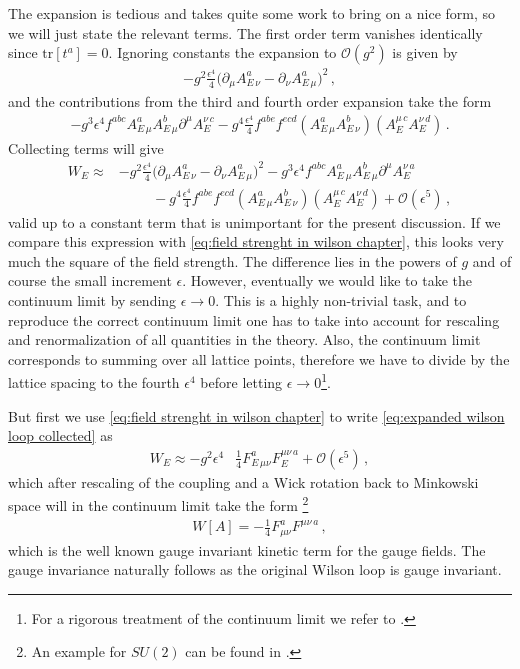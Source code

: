 The expansion is tedious and takes quite some work to bring on a nice form, so we will just state the relevant terms. The first order term vanishes identically since $\text{tr}[t^{a}]=0$. Ignoring constants the expansion to $\mathcal{O}(g^{2})$ is given by
\begin{align}
    -g^{2}\frac{\epsilon^{4}}{4}\big(\partial_{\mu}A_{E\,\nu}^{a}-\partial_{\nu}A_{E\,\mu}^{a}\big)^{2}\,,
\end{align}
and the contributions from the third and fourth order expansion take the form
\begin{align}
    -g^{3}\epsilon^{4}f^{abc}A_{E\,\mu}^{a}A_{E\,\mu}^{b}\partial^{\mu}A_{E}^{\nu\,c}-g^{4}\frac{\epsilon^{4}}{4}f^{abe}f^{ecd}(A_{E\,\mu}^{a}A_{E\,\nu}^{b})(A_{E}^{\mu\,c}A_{E}^{\nu\,d})\,.
\end{align}
Collecting terms will give
\begin{align}\label{eq:expanded wilson loop collected}
    W_{E}\approx&-g^{2}\frac{\epsilon^{4}}{4}\big(\partial_{\mu}A_{E\,\nu}^{a}-\partial_{\nu}A_{E\,\mu}^{a}\big)^{2}-g^{3}\epsilon^{4}f^{abc}A_{E\,\mu}^{a}A_{E\,\mu}^{b}\partial^{\mu}A_{E}^{\nu\,a}\nonumber
    \\
    &\hspace{1cm}-g^{4}\frac{\epsilon^{4}}{4}f^{abe}f^{ecd}(A_{E\,\mu}^{a}A_{E\,\nu}^{b})(A_{E}^{\mu\,c}A_{E}^{\nu\,d})+\mathcal{O}(\epsilon^{5})\,,
\end{align}
valid up to a constant term that is unimportant for the present discussion. If we compare this expression with \cref{eq:field strenght in wilson chapter}, this looks very much the square of the field strength. The difference lies in the powers of $g$ and of course the small increment $\epsilon$. However, eventually we would like to take the continuum limit by sending $\epsilon\rightarrow 0$. This is a highly non-trivial task, and to reproduce the correct continuum limit one has to take into account for rescaling and renormalization of all quantities in the theory. Also, the continuum limit corresponds to summing over all lattice points, therefore we have to divide by the lattice spacing to the fourth $\epsilon^{4}$ before letting $\epsilon\rightarrow 0$\footnote{For a rigorous treatment of the continuum limit we refer to \cite{CASELLE_2000}.}.

But first we use \cref{eq:field strenght in wilson chapter} to write \cref{eq:expanded wilson loop collected} as   
\begin{align}
    W_{E}\approx-g^{2}\epsilon^{4}&\frac{1}{4}F_{E\,\mu\nu}^{a}F_{E}^{\mu\nu\,a}+\mathcal{O}(\epsilon^{5})\,,
\end{align}
which after rescaling of the coupling and a Wick rotation back to Minkowski space will in the continuum limit take the form \footnote{An example for $SU(2)$ can be found in \cite{Peskin:257493}.}
\begin{align}\label{eq:gauge field kinetic term}
    W[A]=-\frac{1}{4}F_{\mu\nu}^{a}F^{\mu\nu\,a}\,,
\end{align}
which is the well known gauge invariant kinetic term for the gauge fields. The gauge invariance naturally follows as the original Wilson loop is gauge invariant.  

